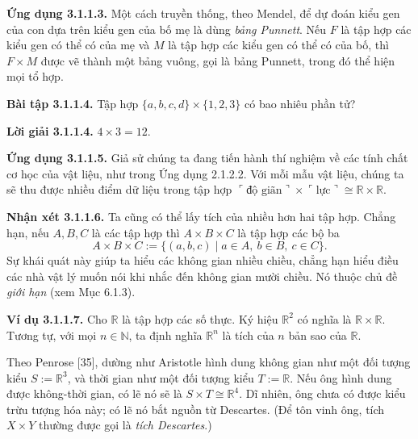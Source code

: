\noindent\textbf{Ứng dụng 3.1.1.3.} Một cách truyền thống, theo Mendel, để dự đoán kiểu gen của con dựa trên kiểu gen của bố mẹ là dùng \emph{bảng Punnett}. Nếu $F$ là tập hợp các kiểu gen có thể có của mẹ và $M$ là tập hợp các kiểu gen có thể có của bố, thì $F\times M$ được vẽ thành một bảng vuông, gọi là bảng Punnett, trong đó thể hiện mọi tổ hợp.

\noindent\textbf{Bài tập 3.1.1.4.} Tập hợp $\{a,b,c,d\}\times\{1,2,3\}$ có bao nhiêu phần tử?

\noindent\textbf{Lời giải 3.1.1.4.} $4\times3=12$.

\noindent\textbf{Ứng dụng 3.1.1.5.} Giả sử chúng ta đang tiến hành thí nghiệm về các tính chất cơ học của vật liệu, như trong Ứng dụng 2.1.2.2. Với mỗi mẫu vật liệu, chúng ta sẽ thu được nhiều điểm dữ liệu trong tập hợp $\ulcorner\text{độ giãn}\urcorner\times\ulcorner\text{lực}\urcorner\cong\mathbb R\times\mathbb R$.

\noindent\textbf{Nhận xét 3.1.1.6.} Ta cũng có thể lấy tích của nhiều hơn hai tập hợp. Chẳng hạn, nếu $A,B,C$ là các tập hợp thì $A\times B\times C$ là tập hợp các bộ ba
\[A\times B\times C:=\{(a,b,c)\mid a\in A,\ b\in B,\ c\in C\}.\]
Sự khái quát này giúp ta hiểu các không gian nhiều chiều, chẳng hạn hiểu điều các nhà vật lý muốn nói khi nhắc đến không gian mười chiều. Nó thuộc chủ đề \emph{giới hạn} (xem Mục 6.1.3).

\noindent\textbf{Ví dụ 3.1.1.7.} Cho $\mathbb R$ là tập hợp các số thực. Ký hiệu $\mathbb R^2$ có nghĩa là $\mathbb R\times\mathbb R$. Tương tự, với mọi $n\in\mathbb N$, ta định nghĩa $\mathbb R^n$ là tích của $n$ bản sao của $\mathbb R$.

Theo Penrose [35], dường như Aristotle hình dung không gian như một đối tượng kiểu $S:=\mathbb R^3$, và thời gian như một đối tượng kiểu $T:=\mathbb R$. Nếu ông hình dung được không-thời gian, có lẽ nó sẽ là $S\times T\cong\mathbb R^4$. Dĩ nhiên, ông chưa có được kiểu trừu tượng hóa này; có lẽ nó bắt nguồn từ Descartes. (Để tôn vinh ông, tích $X\times Y$ thường được gọi là \emph{tích Descartes}.)


